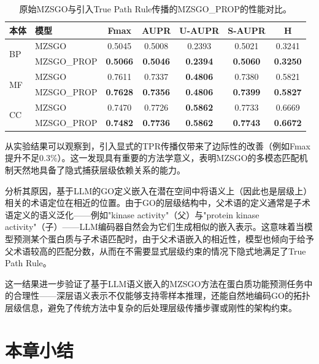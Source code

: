 \begin{table}[htbp]
    \centering
    \caption{原始MZSGO与引入True Path Rule传播的MZSGO\_PROP的性能对比。}
    \label{tab:mzsgo_tpr}
    \small
    \begin{tabular}{llccccc}
        \toprule
        \textbf{本体} & \textbf{模型} & \textbf{Fmax} & \textbf{AUPR} & \textbf{U-AUPR} & \textbf{S-AUPR} & \textbf{H} \\
        \midrule
        \multirow{2}{*}{BP} & MZSGO & 0.5045 & 0.5008 & 0.2393 & 0.5021 & 0.3241 \\
         & MZSGO\_PROP & \textbf{0.5066} & \textbf{0.5046} & \textbf{0.2394} & \textbf{0.5060} & \textbf{0.3250} \\
        \midrule
        \multirow{2}{*}{MF} & MZSGO & 0.7611 & 0.7337 & \textbf{0.4806} & 0.7380 & 0.5821 \\
         & MZSGO\_PROP & \textbf{0.7628} & \textbf{0.7356} & \textbf{0.4806} & \textbf{0.7399} & \textbf{0.5827} \\
        \midrule
        \multirow{2}{*}{CC} & MZSGO & 0.7470 & 0.7726 & \textbf{0.5862} & 0.7733 & 0.6669 \\
         & MZSGO\_PROP & \textbf{0.7482} & \textbf{0.7736} & \textbf{0.5862} & \textbf{0.7743} & \textbf{0.6672} \\
        \bottomrule
    \end{tabular}
\end{table}

从实验结果可以观察到，引入显式的TPR传播仅带来了边际性的改善（例如Fmax提升不足0.3\%）。这一发现具有重要的方法学意义，表明MZSGO的多模态匹配机制天然地具备了隐式捕获层级依赖关系的能力。

分析其原因，基于LLM的GO定义嵌入在潜在空间中将语义上（因此也是层级上）相关的术语定位在相近的位置。由于GO的层级结构中，父术语的定义通常是子术语定义的语义泛化——例如"kinase activity"（父）与"protein kinase activity"（子）——LLM编码器自然会为它们生成相似的嵌入表示。这意味着当模型预测某个蛋白质与子术语匹配时，由于父术语嵌入的相近性，模型也倾向于给予父术语较高的匹配分数，从而在不需要显式层级约束的情况下隐式地满足了True Path Rule。

这一结果进一步验证了基于LLM语义嵌入的MZSGO方法在蛋白质功能预测任务中的合理性——深层语义表示不仅能够支持零样本推理，还能自然地编码GO的拓扑层级信息，避免了传统方法中复杂的后处理层级传播步骤或刚性的架构约束。

\section{本章小结}

